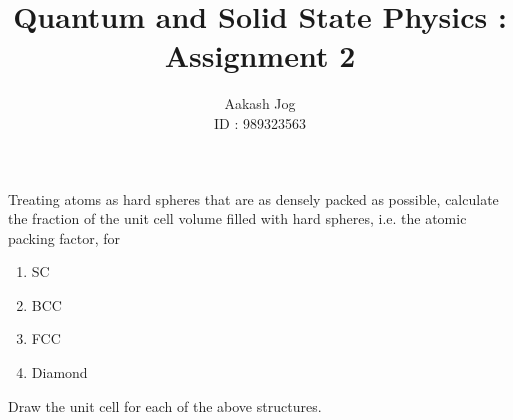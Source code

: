 \documentclass[fleqn, a4paper, 11pt, oneside]{amsart}
\title{Quantum and Solid State Physics : Assignment 2}
\author
{
	Aakash Jog\\
	ID : 989323563
}
\date{\formatdate{29}{10}{2015}}
\theoremstyle{definition}
\theoremstyle{theorem}
\begin{document}

\maketitle

\begin{question}
	Treating atoms as hard spheres that are as densely packed as possible, calculate the fraction of the unit cell volume filled with hard spheres, i.e. the atomic packing factor, for
	\begin{enumerate}
		\item SC
		\item BCC
		\item FCC
		\item Diamond
	\end{enumerate}
	Draw the unit cell for each of the above structures.
\end{question}
\end{document}
